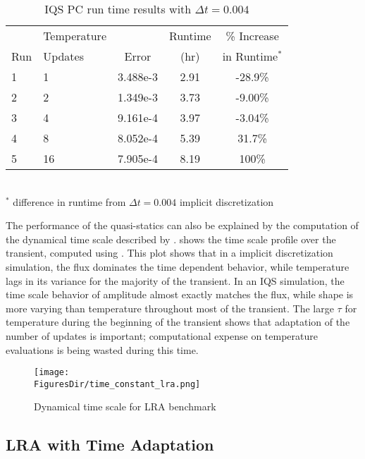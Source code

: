 \begin{table}[!htbp]
\begin{center}
\begin{tabular}{|l|l|ccc|}
\hline
	&  Temperature 	&  		& Runtime 	& \% Increase	\\
Run	&  Updates 	& Error & (hr)		& in Runtime$^*$\\
\hline
1	& 1		& 3.488e-3 	& 2.91 	& -28.9\%	\\
2	& 2		& 1.349e-3 	& 3.73	& -9.00\%	\\
3 	& 4 	& 9.161e-4 	& 3.97	& -3.04\%	\\
4 	& 8 	& 8.052e-4 	& 5.39	&  31.7\%	\\
5 	& 16	& 7.905e-4 	& 8.19	&  100\%	\\
\hline
\end{tabular}
\\
$^*$ difference in runtime from $\Delta t = 0.004$ implicit discretization 
\caption{IQS PC run time results with $\Delta t = 0.004$}
\label{tab:iqspc_lra}
\end{center}
\end{table}

The performance of the quasi-statics can also be explained by the computation of the dynamical time scale described by .   shows the time scale profile over the transient, computed using .  This plot shows that in a implicit discretization simulation, the flux dominates the time dependent behavior, while temperature lags in its variance for the majority of the transient.  In an IQS simulation, the time scale behavior of amplitude almost exactly matches the flux, while shape is more varying than temperature throughout most of the transient.  The large $\tau$ for temperature during the beginning of the transient shows that adaptation of the number of updates is important; computational expense on temperature evaluations is being wasted during this time.

\begin{figure}[htbp!]
\centering
\texttt{[image: \\FiguresDir/time\_constant\_lra.png]}
\caption{Dynamical time scale for LRA benchmark}
\label{fig:LRAtc}
\end{figure}

\subsection{LRA with Time Adaptation}

